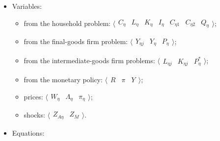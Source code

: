 \documentclass[../thesis.tex]{subfiles}
\begin{document}
{\singlespacing
	
	\begin{itemize}

		\item Variables:
		
	\begin{itemize}
	
		\item from the household problem: $\langle \begin{matrix} C_{\eta } & L_{\eta } & K_{\eta } & I_{\eta } & C_{\eta 1} & C_{\eta 2} & Q_{\eta } \end{matrix} \rangle$;
		
		\item from the final-goods firm problem: $\langle \begin{matrix} Y_{\eta j} & Y_{\eta } & P_{\eta } \end{matrix} \rangle$;
		
		\item from the intermediate-goods firm problems: $\langle \begin{matrix} L_{\eta j} & K_{\eta j} & P_{\eta }^{\ast} \end{matrix} \rangle$;
		
		\item from the monetary policy: $\langle \begin{matrix} R_{} & \pi_{} & Y_{} \end{matrix} \rangle$;
		
		
		\item prices: $\langle \begin{matrix} W_{\eta } & \Lambda_{\eta } & \pi_{\eta } \end{matrix} \rangle$;
		
		\item shocks: $\langle \begin{matrix} Z_{A\eta } & Z_{M} \end{matrix} \rangle$.

	\end{itemize}

		\item Equations:

	\begin{enumerate}


\end{enumerate}
\end{itemize}}
\end{document}
